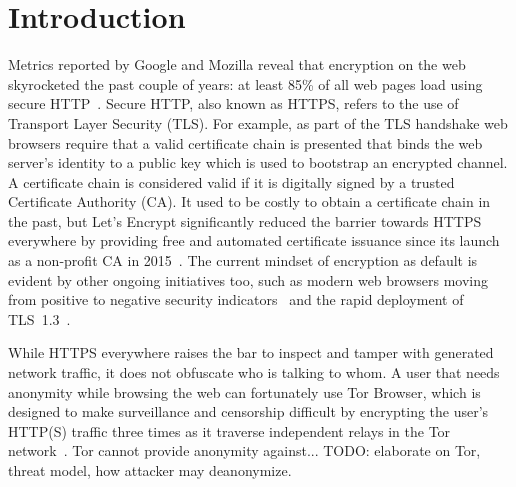 %
%
%
\section{Introduction} \label{sec:introduction}
%
%
Metrics reported by Google and Mozilla reveal that encryption on the web
skyrocketed the past couple of years: at least 85\% of all web pages load using
secure HTTP~\cite{google-metrics,mozilla-metrics}.  Secure HTTP, also known as
HTTPS, refers to the use of Transport Layer Security (TLS).  For example, as
part of the TLS handshake web browsers require that a valid certificate chain
is presented that binds the web server's identity to a public key which is used
to bootstrap an encrypted channel.  A certificate chain is considered valid if
it is digitally signed by a trusted Certificate Authority (CA).  It used to be
costly to obtain a certificate chain in the past, but Let's Encrypt
significantly reduced the barrier towards HTTPS everywhere by providing free
and automated certificate issuance since its launch as a non-profit CA in
2015~\cite{le}.
The current mindset of encryption as default is evident by other ongoing
initiatives too, such as
	modern web browsers moving from positive to negative security
		indicators~\cite{chrome-ui,firefox-ui} and
	the rapid deployment of TLS~1.3~\cite{rapid-tls13}.

%
%
While HTTPS everywhere raises the bar to inspect and tamper with generated
network traffic, it does not obfuscate who is talking to whom.  A user that
needs anonymity while browsing the web can fortunately use Tor Browser, which
is designed to make surveillance and censorship difficult by encrypting the
user's HTTP(S) traffic three times as it traverse independent relays in the Tor
network~\cite{tor}.  Tor cannot provide anonymity against...
TODO: elaborate on Tor, threat model, how attacker may deanonymize.

